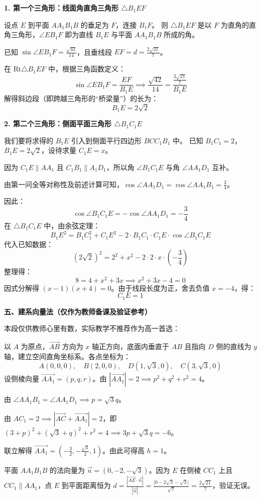{  \noindent\textbf{1. 第一个三角形：线面角直角三角形 $\triangle B_1EF$}\par
  设点 $E$ 到平面 $AA_1B_1B$ 的垂足为 $F$，连接 $B_1F$。
  则 $\triangle B_1EF$ 是以 $F$ 为直角的直角三角形，$\angle EB_1F$ 即为直线 $B_1E$ 与平面 $AA_1B_1B$ 所成的角。\par
  已知 $\sin\angle EB_1F = \frac{\sqrt{42}}{14}$，且垂线段 $EF = d = \frac{2\sqrt{21}}{7}$。\par
  在 Rt$\triangle B_1EF$ 中，根据三角函数定义：
  \[ \sin\angle EB_1F = \frac{EF}{B_1E} \implies \frac{\sqrt{42}}{14} = \frac{\frac{2\sqrt{21}}{7}}{B_1E} \]
  解得斜边段（即跨越三角形的“桥梁量”）的长为：
  \[ \boxed{B_1E = 2\sqrt{2}} \]

  \noindent\textbf{2. 第二个三角形：侧面平面三角形 $\triangle B_1C_1E$}\par
  我们要将求得的 $B_1E$ 引入到侧面平行四边形 $BCC_1B_1$ 中。
  已知 $B_1C_1 = 2$，$B_1E = 2\sqrt{2}$，设待求量 $C_1E = x$。\par
  因为 $C_1E \parallel AA_1$ 且 $C_1B_1 \parallel A_1D_1$，所以角 $\angle B_1C_1E$ 与角 $\angle AA_1D_1$ 互补。\par
  由第一问全等对称性及前述计算可知，$\cos\angle AA_1D_1 = \cos\angle AA_1B_1 = \frac{3}{4}$。\par
  因此：
  \[ \cos\angle B_1C_1E = -\cos\angle AA_1D_1 = -\frac{3}{4} \]
  在 $\triangle B_1C_1E$ 中，由余弦定理：
  \[ B_1E^2 = B_1C_1^2 + C_1E^2 - 2 \cdot B_1C_1 \cdot C_1E \cdot \cos\angle B_1C_1E \]
  代入已知数据：
  \[ (2\sqrt{2})^2 = 2^2 + x^2 - 2 \cdot 2 \cdot x \cdot \left(-\frac{3}{4}\right) \]
  整理得：
  \[ 8 = 4 + x^2 + 3x \implies x^2 + 3x - 4 = 0 \]
  因式分解得 $(x-1)(x+4) = 0$。由于线段长度为正，舍去负值 $x = -4$，得：
  \[ \boxed{C_1E = 1} \]

  \medskip
  \noindent\textbf{五、建系向量法（仅作为教师备课及验证参考）}\par
  本段仅供教师心里有数，实际教学不推荐作为高一首选：\par
  以 $A$ 为原点，$\overrightarrow{AB}$ 方向为 $x$ 轴正方向，底面内垂直于 $AB$ 且指向 $D$ 侧的直线为 $y$ 轴，建立空间直角坐标系。各点坐标为：
  \[ A(0,0,0),\quad B(2,0,0),\quad D(1,\sqrt{3},0),\quad C(3,\sqrt{3},0) \]
  设侧棱向量 $\overrightarrow{AA_1} = (p,q,r)$。由 $|\overrightarrow{AA_1}| = 2 \implies p^2 + q^2 + r^2 = 4$。\par
  由 $\angle AA_1B_1 = \angle AA_1D_1 \implies p = \sqrt{3}q$。\par
  由 $AC_1 = 2 \implies |\overrightarrow{AC} + \overrightarrow{AA_1}| = 2$，即 $(3+p)^2 + (\sqrt{3}+q)^2 + r^2 = 4 \implies 3p + \sqrt{3}q = -6$。\par
  联立解得 $\overrightarrow{AA_1} = \left(-\frac{3}{2}, -\frac{\sqrt{3}}{2}, 1\right)$。由此可得高 $h = 1$。\par
  平面 $AA_1B_1B$ 的法向量为 $\vec{n} = (0, -2, -\sqrt{3})$。因为 $E$ 在侧棱 $CC_1$ 上且 $CC_1 \parallel AA_1$，点 $E$ 到平面距离恒为 $d = \frac{|\overrightarrow{AE} \cdot \vec{n}|}{|\vec{n}|} = \frac{|0 - 2\sqrt{3} - \sqrt{3}|}{\sqrt{7}} = \frac{2\sqrt{21}}{7}$，验证无误。

}
